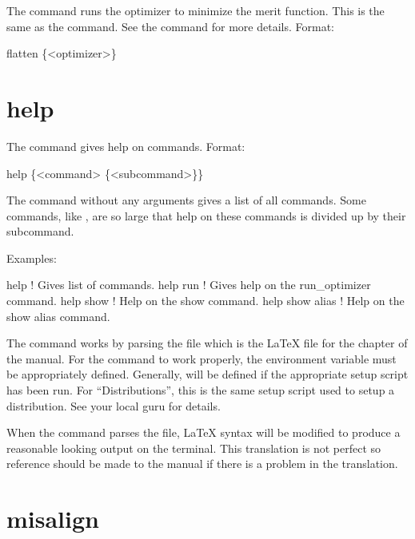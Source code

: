 The  command runs the optimizer to minimize the merit function. This is the same as the
 command.  See the  command for more details. Format:
\begin{example}
  flatten \{<optimizer>\}
\end{example}

\vskip 10pt

\section{help}
\label{s:help}

The  command gives help on \tao commands. Format:
\begin{example}
  help \{<command> \{<subcommand>\}\}
\end{example}

\vskip 10pt
The  command without any arguments gives a list of all commands.  Some commands, like
, are so large that help on these commands is divided up by their subcommand.

Examples:
\begin{example}
  help            ! Gives list of commands.
  help run        ! Gives help on the run_optimizer command.
  help show       ! Help on the show command.
  help show alias ! Help on the show alias command.
\end{example}

The  command works by parsing the file  which is the
LaTeX file for the  chapter of the \tao manual. For the  command to work
properly, the environment variable  must be appropriately defined. Generally,
 will be defined if the appropriate \bmad setup script has been run. For
``Distributions'', this is the same setup script used to setup a distribution. See your local \bmad
guru for details.

When the  command parses the  file, LaTeX syntax will be
modified to produce a reasonable looking output on the terminal. This translation is not perfect so
reference should be made to the \tao manual if there is a problem in the translation.

\section{misalign}
\label{s:misalign}

